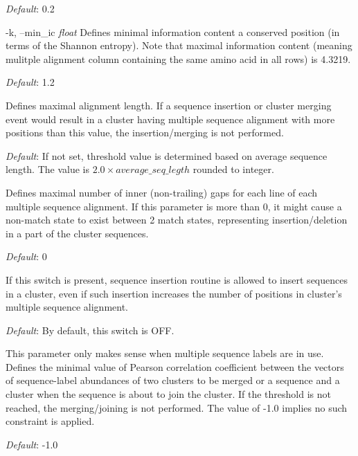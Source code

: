 \documentclass[11pt, a4paper, twoside, titlepage]{article}
\begin{document}
\begin{description}
	  	  \textit{Default}: 0.2
	  	  
\begin{sloppypar}	
	  	  
	  	  	  	  	  	  \item[-k, --min\_ic \rm \textlangle \textit{float}\textrangle] Defines minimal information content a conserved position (in terms of the Shannon entropy). Note that maximal information content (meaning mulitple alignment column containing the same amino acid in all rows) is 4.3219. 
	  	  	  	  	  	  
\end{sloppypar}	
	  	  
	  	  \textit{Default}: 1.2
	  	  	  	  
	  	  
	  	  	  	\item[-j, --max\_aln\_length \rm \textlangle \textit{int}\textrangle] Defines maximal alignment length. If a sequence insertion or cluster merging event would result in a cluster having multiple sequence alignment with more positions than this value, the insertion/merging is not performed.
	  	  	  	
	  	  	  	\textit{Default}: If not set, threshold value is determined based on average sequence length. The value is $2.0 \times average\_seq\_legth$ rounded to integer.
	  	  	  	
	  	  	  		  	  	  	\item[-u, --max\_inner\_gaps \rm \textlangle \textit{int}\textrangle]  Defines maximal number of inner (non-trailing) gaps for each line of each multiple sequence alignment. If this parameter is more than 0, it might cause a non-match state to exist between 2 match states, representing insertion/deletion in a part of the cluster sequences.
	  	  	  	
	  	  	  	\textit{Default}: 0
	  	  	  	
	  	  	  	\item[-q, --extension\_increase\_length] If this switch is present, sequence insertion routine is allowed to insert sequences in a cluster, even if such insertion increases the number of positions in cluster's multiple sequence alignment. 
	  	  	  	
	  	  	  	\textit{Default}: By default, this switch is OFF. 

	  	  
	  	  	  	  	  	  \item[-C, --min\_correlation \rm \textlangle \textit{float[-1.0, 1.0]}\textrangle] This parameter only makes sense when multiple sequence labels are in use. Defines the minimal value of Pearson correlation coefficient between the vectors of sequence-label abundances of two clusters to be merged or a sequence and a cluster when the sequence is about to join the cluster. If the threshold is not reached, the merging/joining is not performed. The value of -1.0 implies no such constraint is applied.
	  	  	  	  	  	  	
	  	  
	  	  \textit{Default}: -1.0
	  	  	  	  


\end{description}
\end{document}
